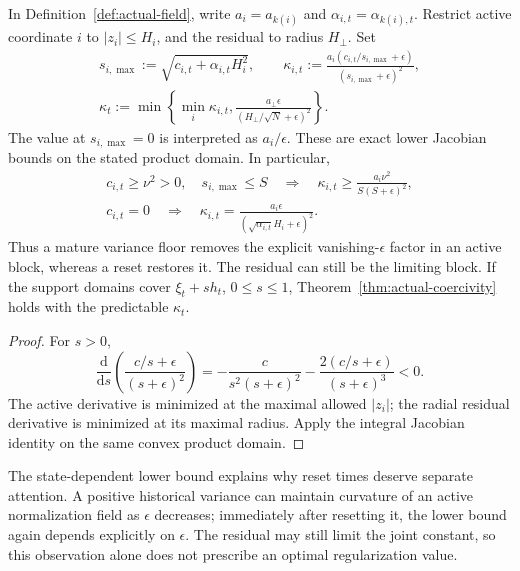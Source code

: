 \begin{lemma}
\label{lem:actual-mature-variance}
In Definition~\ref{def:actual-field}, write $a_i=a_{k(i)}$ and
$\alpha_{i,t}=\alpha_{k(i),t}$. Restrict active coordinate $i$ to
$|z_i|\le H_i$, and the residual to radius $H_\perp$. Set
\begin{gather}
 s_{i,\max}:=\sqrt{c_{i,t}+\alpha_{i,t}H_i^2},\qquad
 \kappa_{i,t}:=\frac{a_i(c_{i,t}/s_{i,\max}+\epsilon)}
                               {(s_{i,\max}+\epsilon)^2},\\
 \kappa_t:=\min\left\{\min_i\kappa_{i,t},
           \frac{a_\perp\epsilon}{(H_\perp/\sqrt N+\epsilon)^2}\right\}.
\end{gather}
The value at $s_{i,\max}=0$ is interpreted as $a_i/\epsilon$. These are exact
lower Jacobian bounds on the stated product domain. In particular,
\begin{gather}
 c_{i,t}\ge\nu^2>0,\quad s_{i,\max}\le S
 \quad\Longrightarrow\quad
 \kappa_{i,t}\ge\frac{a_i\nu^2}{S(S+\epsilon)^2},\\
 c_{i,t}=0\quad\Longrightarrow\quad
 \kappa_{i,t}=\frac{a_i\epsilon}{(\sqrt{\alpha_{i,t}}H_i+\epsilon)^2}.
\end{gather}
Thus a mature variance floor removes the explicit vanishing-$\epsilon$ factor
in an active block, whereas a reset restores it. The residual can still be the
limiting block. If the support domains cover $\xi_t+sh_t$, $0\le s\le1$,
Theorem~\ref{thm:actual-coercivity} holds with the predictable $\kappa_t$.
\end{lemma}
\begin{proof}
For $s>0$,
\begin{equation}
 \frac{\mathrm d}{\mathrm ds}\left(\frac{c/s+\epsilon}{(s+\epsilon)^2}\right)
 =-\frac{c}{s^2(s+\epsilon)^2}
   -\frac{2(c/s+\epsilon)}{(s+\epsilon)^3}<0.
\end{equation}
The active derivative is minimized at the maximal allowed $|z_i|$; the radial
residual derivative is minimized at its maximal radius. Apply the integral
Jacobian identity on the same convex product domain.
\end{proof}
The state-dependent lower bound explains why reset times deserve separate
attention. A positive historical variance can maintain curvature of an active
normalization field as $\epsilon$ decreases; immediately after resetting it,
the lower bound again depends explicitly on $\epsilon$. The residual may still
limit the joint constant, so this observation alone does not prescribe an
optimal regularization value.

